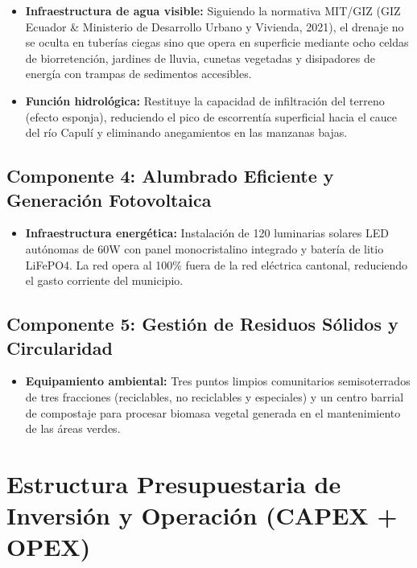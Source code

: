 \documentclass[
  spanish,
  letterpaper,
  DIV=11,
  numbers=noendperiod]{scrartcl}
\providecommand{\tightlist}{%
  \setlength{\itemsep}{0pt}\setlength{\parskip}{0pt}}
\begin{document}
\begin{itemize}
\tightlist
\item
  \textbf{Infraestructura de agua visible:} Siguiendo la normativa
  MIT/GIZ (GIZ Ecuador \& Ministerio de Desarrollo Urbano y Vivienda,
  2021), el drenaje no se oculta en tuberías ciegas sino que opera en
  superficie mediante ocho celdas de biorretención, jardines de lluvia,
  cunetas vegetadas y disipadores de energía con trampas de sedimentos
  accesibles.
\item
  \textbf{Función hidrológica:} Restituye la capacidad de infiltración
  del terreno (efecto esponja), reduciendo el pico de escorrentía
  superficial hacia el cauce del río Capulí y eliminando anegamientos en
  las manzanas bajas.
\end{itemize}

\subsection{Componente 4: Alumbrado Eficiente y Generación
Fotovoltaica}\label{componente-4-alumbrado-eficiente-y-generaciuxf3n-fotovoltaica}

\begin{itemize}
\tightlist
\item
  \textbf{Infraestructura energética:} Instalación de 120 luminarias
  solares LED autónomas de 60W con panel monocristalino integrado y
  batería de litio LiFePO4. La red opera al 100\% fuera de la red
  eléctrica cantonal, reduciendo el gasto corriente del municipio.
\end{itemize}

\subsection{Componente 5: Gestión de Residuos Sólidos y
Circularidad}\label{componente-5-gestiuxf3n-de-residuos-suxf3lidos-y-circularidad}

\begin{itemize}
\tightlist
\item
  \textbf{Equipamiento ambiental:} Tres puntos limpios comunitarios
  semisoterrados de tres fracciones (reciclables, no reciclables y
  especiales) y un centro barrial de compostaje para procesar biomasa
  vegetal generada en el mantenimiento de las áreas verdes.
\end{itemize}

\section{Estructura Presupuestaria de Inversión y Operación (CAPEX +
OPEX)}\label{estructura-presupuestaria-de-inversiuxf3n-y-operaciuxf3n-capex-opex}
\end{document}
